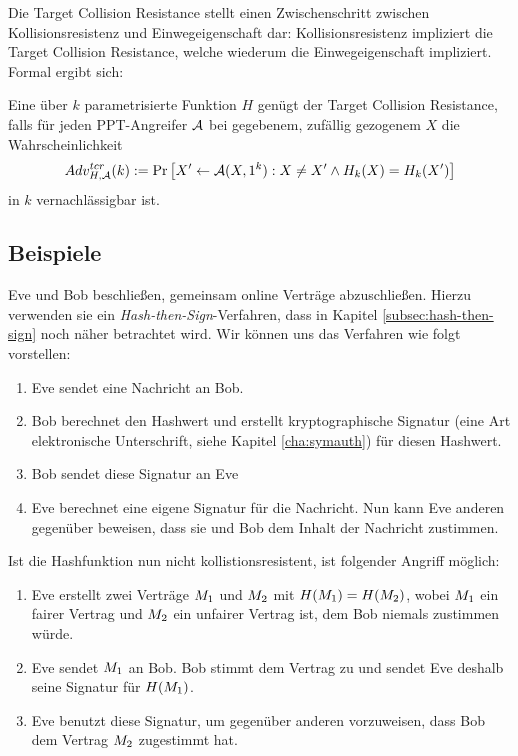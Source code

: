 Die Target Collision Resistance stellt einen Zwischenschritt zwischen Kollisionsresistenz und Einwegeigenschaft dar: Kollisionsresistenz impliziert die
Target Collision Resistance, welche wiederum die Einwegeigenschaft impliziert. Formal ergibt sich:\\

\begin{definition}
Eine über $k$ parametrisierte Funktion $H$ genügt der Target Collision Resistance\indexTargetCollisionResistance, falls für jeden PPT-Angreifer $\mathcal{A}$ bei gegebenem, zufällig gezogenem $X$ die Wahrscheinlichkeit
\begin{equation*}
Adv^{tcr}_{H,\mathcal{A}}(k):= \Pr \left[ X' \leftarrow \mathcal{A}(X, 1^k) : X \neq X' \land H_k(X) = H_k(X')\right]
\end{equation*}
in $k$ vernachlässigbar ist.
\end{definition}
\subsection{Beispiele}

\begin{beispiel}\indexCollisionResistance
Eve und Bob beschließen, gemeinsam online Verträge abzuschließen. Hierzu
verwenden sie ein \textit{Hash-then-Sign}-Verfahren, dass in Kapitel
\ref{subsec:hash-then-sign} noch näher betrachtet wird. Wir können uns
das Verfahren wie 
folgt vorstellen: 
\begin{enumerate}
\item Eve sendet eine Nachricht an Bob.
\item Bob berechnet den Hashwert und erstellt kryptographische
  Signatur (eine Art \glqq elektronische Unterschrift\grqq, siehe
  Kapitel \ref{cha:symauth}) für diesen Hashwert.
\item Bob sendet diese Signatur an Eve
\item Eve berechnet eine eigene Signatur für die Nachricht. Nun kann Eve
  anderen gegenüber beweisen, dass sie und Bob dem Inhalt der Nachricht
  zustimmen. 
\end{enumerate}
Ist die Hashfunktion nun nicht kollistionsresistent, ist folgender
Angriff möglich:
\begin{enumerate}
\item Eve erstellt zwei Verträge $M_1$ und $M_2$ mit
  $H(M_1) = H(M_2)$, wobei
  $M_1$ ein fairer Vertrag und $M_2$ ein unfairer Vertrag
  ist, dem Bob niemals zustimmen würde.
\item Eve sendet $M_1$ an Bob. Bob stimmt dem Vertrag zu und
  sendet Eve deshalb seine Signatur für $H(M_1)$.
\item Eve benutzt diese Signatur, um gegenüber anderen vorzuweisen, dass
  Bob dem Vertrag $M_2$ zugestimmt hat.
\end{enumerate}
\end{beispiel}

